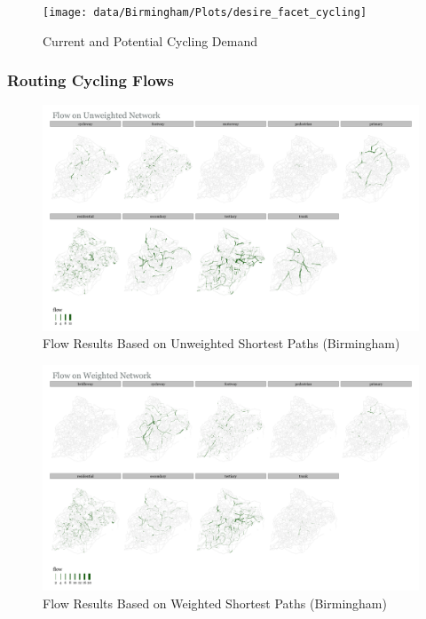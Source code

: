 \documentclass[
]{article}
\begin{document}
\begin{figure}[H]

{\centering \texttt{[image: data/Birmingham/Plots/desire\_facet\_cycling]} 

}

\caption{Current and Potential Cycling Demand}\label{fig:desirefacetcyclingBirmingham}
\end{figure}

\clearpage

\subsubsection{Routing Cycling Flows}

\begin{figure}

{\centering \includegraphics[width=0.75\linewidth]{data/Birmingham/Plots/flows_facet_unweighted_Birmingham} 

}

\caption{Flow Results Based on Unweighted Shortest Paths (Birmingham)}\label{fig:flowsfacetunweightedBirmingham}
\end{figure}

\begin{figure}

{\centering \includegraphics[width=0.75\linewidth]{data/Birmingham/Plots/flows_facet_weighted_Birmingham} 

}

\caption{Flow Results Based on Weighted Shortest Paths (Birmingham)}\label{fig:flowsfacetweightedBirmingham}
\end{figure}
\end{document}

